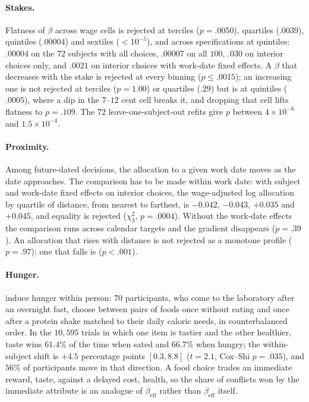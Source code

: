 \documentclass[11pt,a4paper]{article}
\theoremstyle{plain}
\theoremstyle{definition}
\newcommand{\beff}{\beta_{\mathrm{eff}}}
\begin{document}
\paragraph{Stakes.} Flatness of $\beta$ across wage cells is rejected at terciles ($p=.0050$), quartiles ($.0039$),
quintiles ($.00004$) and sextiles ($<10^{-5}$), and across specifications at quintiles: $.00004$ on the $72$ subjects
with all choices, $.00007$ on all $100$, $.030$ on interior choices only, and $.0021$ on interior choices with
work-date fixed effects. A $\beta$ that decreases with the stake is rejected at every binning ($p\le.0015$); an
increasing one is not rejected at terciles ($p=1.00$) or quartiles ($.29$) but is at quintiles ($.0005$), where a dip
in the $7$--$12$ cent cell breaks it, and dropping that cell lifts flatness to $p=.109$. The $72$ leave-one-subject-out
refits give $p$ between $4\times10^{-6}$ and $1.5\times10^{-4}$.

\paragraph{Proximity.} Among future-dated decisions, the allocation to a given work date moves as the date
approaches. The comparison has to be made within work date: with subject and work-date fixed effects on interior
choices, the wage-adjusted log allocation by quartile of distance, from nearest to farthest, is $-0.042$, $-0.043$,
$+0.035$ and $+0.045$, and equality is rejected ($\chi^2_3$, $p=.0004$). Without the work-date effects the comparison
runs across calendar targets and the gradient disappears ($p=.39$). An allocation that rises with distance is not
rejected as a monotone profile ($p=.97$); one that falls is ($p<.001$).

\paragraph{Hunger.} \citet{marchgluth2025} induce hunger within person: $70$ participants, who come to the laboratory after
an overnight fast, choose between pairs of foods once without eating and once after a protein shake matched to their
daily caloric needs, in counterbalanced order.
In the $10{,}595$ trials in which one item is tastier and the other healthier, taste wins $61.4\%$ of the time when
sated and $66.7\%$ when hungry; the within-subject shift is $+4.5$ percentage points $[0.3,8.8]$ ($t=2.1$, Cox--Shi
$p=.035$), and $56\%$ of participants move in that direction. A food choice trades an immediate reward, taste,
against a delayed cost, health, so the share of conflicts won by the immediate attribute is an analogue of $\beff$
rather than $\beff$ itself.
\end{document}
